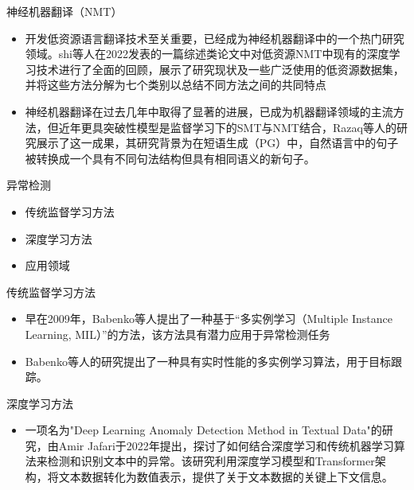 \documentclass[UTF8]{beamer}
\begin{document}
\begin{frame}{神经机器翻译（NMT）}
    \scriptsize
    \begin{itemize}
        \item 开发低资源语言翻译技术至关重要，已经成为神经机器翻译中的一个热门研究领域。shi等人在2022发表的一篇综述类论文中对低资源NMT中现有的深度学习技术进行了全面的回顾，展示了研究现状及一些广泛使用的低资源数据集，并将这些方法分解为七个类别以总结不同方法之间的共同特点
        \item 神经机器翻译在过去几年中取得了显著的进展，已成为机器翻译领域的主流方法，但近年更具突破性模型是监督学习下的SMT与NMT结合，Razaq等人的研究展示了这一成果，其研究背景为在短语生成（PG）中，自然语言中的句子被转换成一个具有不同句法结构但具有相同语义的新句子。
    \end{itemize}
\end{frame}

\begin{frame}{异常检测}
    \begin{itemize}
        \item 传统监督学习方法
        \item 深度学习方法
        \item 应用领域
    \end{itemize}
\end{frame}

\begin{frame}{传统监督学习方法}
    \begin{itemize}
        \item 早在2009年，Babenko等人提出了一种基于“多实例学习（Multiple Instance Learning, MIL）”的方法，该方法具有潜力应用于异常检测任务
        \item Babenko等人的研究提出了一种具有实时性能的多实例学习算法，用于目标跟踪。
    \end{itemize}
\end{frame}

\begin{frame}{深度学习方法}
    \begin{itemize}
        \item 一项名为"Deep Learning Anomaly Detection Method in Textual Data"的研究，由Amir Jafari于2022年提出，探讨了如何结合深度学习和传统机器学习算法来检测和识别文本中的异常。该研究利用深度学习模型和Transformer架构，将文本数据转化为数值表示，提供了关于文本数据的关键上下文信息。
    \end{itemize}
\end{frame}
\end{document}
